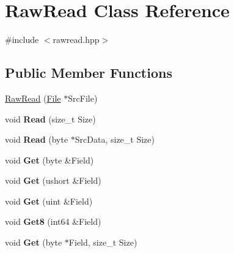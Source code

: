 \hypertarget{class_raw_read}{\section{Raw\-Read Class Reference}
\label{class_raw_read}
}


{\ttfamily \#include $<$rawread.\-hpp$>$}

\subsection*{Public Member Functions}
\begin{DoxyCompactItemize}
\item 
\hyperlink{class_raw_read_a1a9f297d8dd914ac067267bb9e4ce589}{Raw\-Read} (\hyperlink{class_file}{File} $\ast$Src\-File)
\item 
\hypertarget{class_raw_read_a0ed3fce8f38f950d45da36736b520520}{void {\bfseries Read} (size\-\_\-t Size)}\label{class_raw_read_a0ed3fce8f38f950d45da36736b520520}

\item 
\hypertarget{class_raw_read_a6c5aa71f05a102004a102adcafbb8a5c}{void {\bfseries Read} (byte $\ast$Src\-Data, size\-\_\-t Size)}\label{class_raw_read_a6c5aa71f05a102004a102adcafbb8a5c}

\item 
\hypertarget{class_raw_read_ac74d0439fc0203119332e6df19683c85}{void {\bfseries Get} (byte \&Field)}\label{class_raw_read_ac74d0439fc0203119332e6df19683c85}

\item 
\hypertarget{class_raw_read_a5ad89c0e6831687b144b4d5f4610f608}{void {\bfseries Get} (ushort \&Field)}\label{class_raw_read_a5ad89c0e6831687b144b4d5f4610f608}

\item 
\hypertarget{class_raw_read_abdf916d71c4e85b03fb525d88fafb9ce}{void {\bfseries Get} (uint \&Field)}\label{class_raw_read_abdf916d71c4e85b03fb525d88fafb9ce}

\item 
\hypertarget{class_raw_read_a0d114615c5830333b07d2a3893f7d647}{void {\bfseries Get8} (int64 \&Field)}\label{class_raw_read_a0d114615c5830333b07d2a3893f7d647}

\item 
\hypertarget{class_raw_read_ab38e81db925883b02c70e86166727cc5}{void {\bfseries Get} (byte $\ast$Field, size\-\_\-t Size)}\label{class_raw_read_ab38e81db925883b02c70e86166727cc5}


\end{DoxyCompactItemize}
